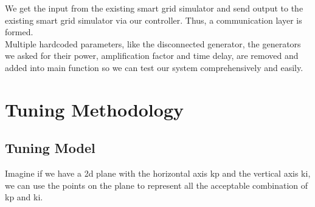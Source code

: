 \documentclass{report}
\begin{document}
We get the input from the existing smart grid simulator and send output to the existing smart grid simulator via our controller. Thus, a communication layer is formed.\\

Multiple hardcoded parameters, like the disconnected generator, the generators we asked for their power, amplification factor and time delay, are removed and added into main function so we can test our system comprehensively and easily.\\


\section{Tuning Methodology } %
\subsection{Tuning Model} %
Imagine if we have a 2d plane with the horizontal axis kp and the vertical axis ki, we can use the points on the plane to represent all the acceptable combination of kp and ki.\\
\end{document}

